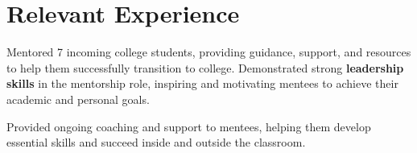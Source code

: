 
  \section{Relevant Experience}
  \begin{tightemize}
      \item Mentored 7 incoming college students, providing guidance, support, and resources to help them successfully transition to college. Demonstrated strong {\bf leadership skills} in the mentorship role, inspiring and motivating mentees to achieve their academic and personal goals.
      \item Provided ongoing coaching and support to mentees, helping them develop essential skills and succeed inside and outside the classroom.
  \end{tightemize}